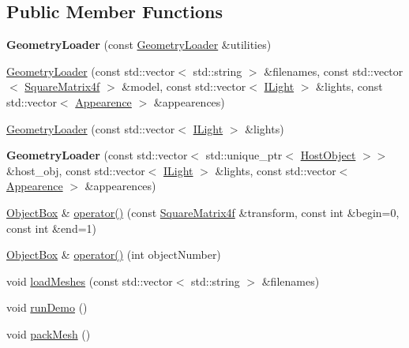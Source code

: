 \subsection*{Public Member Functions}
\begin{DoxyCompactItemize}
\item 
{\bfseries Geometry\+Loader} (const \hyperlink{class_geometry_loader}{Geometry\+Loader} \&utilities)\hypertarget{class_geometry_loader_a9c9114a5b074611c21bed13b4a4e5020}{}\label{class_geometry_loader_a9c9114a5b074611c21bed13b4a4e5020}

\item 
\hyperlink{class_geometry_loader_acdbb37e0f355aec4bd1c43315ca062de}{Geometry\+Loader} (const std\+::vector$<$ std\+::string $>$ \&filenames, const std\+::vector$<$ \hyperlink{class_square_matrix4}{Square\+Matrix4f} $>$ \&model, const std\+::vector$<$ \hyperlink{class_i_light}{I\+Light} $>$ \&lights, const std\+::vector$<$ \hyperlink{struct_appearence}{Appearence} $>$ \&appearences)
\item 
\hyperlink{class_geometry_loader_ad1e31702fc39f0fcc216beca12967872}{Geometry\+Loader} (const std\+::vector$<$ \hyperlink{class_i_light}{I\+Light} $>$ \&lights)
\item 
{\bfseries Geometry\+Loader} (const std\+::vector$<$ std\+::unique\+\_\+ptr$<$ \hyperlink{class_host_object}{Host\+Object} $>$$>$ \&host\+\_\+obj, const std\+::vector$<$ \hyperlink{class_i_light}{I\+Light} $>$ \&lights, const std\+::vector$<$ \hyperlink{struct_appearence}{Appearence} $>$ \&appearences)\hypertarget{class_geometry_loader_a0fba129ffcc51352ce49d22d30e83732}{}\label{class_geometry_loader_a0fba129ffcc51352ce49d22d30e83732}

\item 
\hyperlink{class_object_box}{Object\+Box} \& \hyperlink{class_geometry_loader_a99722ce01101349a6c792e87cc488d36}{operator()} (const \hyperlink{class_square_matrix4}{Square\+Matrix4f} \&transform, const int \&begin=0, const int \&end=1)
\item 
\hyperlink{class_object_box}{Object\+Box} \& \hyperlink{class_geometry_loader_a71c1d727c3939d3e4de530d8a4504687}{operator()} (int object\+Number)
\item 
void \hyperlink{class_geometry_loader_a41504f514cf9aed65d385e401ae2de22}{load\+Meshes} (const std\+::vector$<$ std\+::string $>$ \&filenames)
\item 
void \hyperlink{class_geometry_loader_ae12a7d2e1dddd53e79cf42edf7ce59d6}{run\+Demo} ()
\item 
void \hyperlink{class_geometry_loader_a9ee90083c2f62768f8a2c613fdcf0715}{pack\+Mesh} ()\hypertarget{class_geometry_loader_a9ee90083c2f62768f8a2c613fdcf0715}{}\label{class_geometry_loader_a9ee90083c2f62768f8a2c613fdcf0715}


\end{DoxyCompactItemize}
